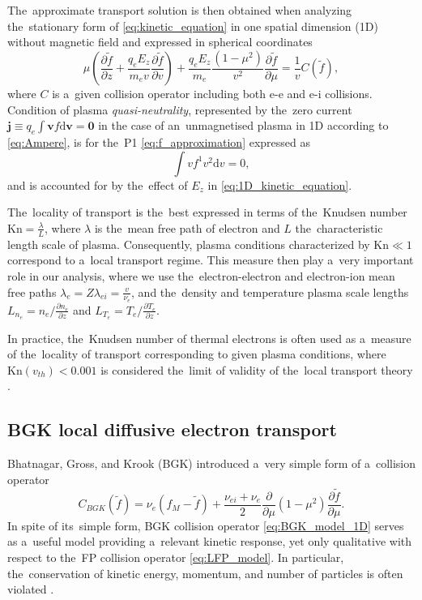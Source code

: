 \documentclass[
 aps,
 jmp,
 amsmath,amssymb,
 twocolumn,
]{revtex4-1}
\newcommand{\pdv}[2]{\frac{\partial{#1}}{\partial{#2}}}
\newcommand{\vect}[1]{\boldsymbol{#1}}
\newcommand{\dI}{\text{d}}
\newcommand{\mfpe}{\lambda_e}
\newcommand{\mfpei}{\lambda_{ei}}
\newcommand{\Zbar}{Z}
\newcommand{\nue}{\nu_{e}}
\newcommand{\nuei}{\nu_{ei}}
\newcommand{\vmag}{v}
\newcommand{\vth}{v_{th}}
\newcommand{\Ez}{E_z}
\newcommand{\qe}{q_e}
\newcommand{\me}{m_e}
\newcommand{\fM}{f_M}
\newcommand{\ft}{f}
\begin{document}
The~approximate transport solution is then obtained when analyzing 
the~stationary form of \eqref{eq:kinetic_equation} in one spatial dimension
(1D) without magnetic field and expressed in spherical coordinates 
\begin{equation}
  \mu\left(\pdv{\tilde{f}}{z} 
  + \frac{\qe\Ez}{\me\vmag}\pdv{\tilde{f}}{\vmag}\right) 
  + \frac{\qe\Ez}{\me}\frac{(1-\mu^2)}{\vmag^2}\pdv{\tilde{f}}{\mu}
  = \frac{1}{\vmag}C(\tilde{\ft}) ,
  \label{eq:1D_kinetic_equation}
\end{equation}
where $C$ is a~given collision operator including both e-e and e-i collisions.
Condition of plasma \textit{quasi-neutrality}, 
represented by the~zero current 
$\vect{j} \equiv \qe \int \vect{v} \ft \dI\vect{v} = \vect{0}$ 
in the case of an~unmagnetised plasma in 1D according to \eqref{eq:Ampere}, 
is for the~P1 \eqref{eq:f_approximation} expressed as
\begin{equation}
  \int \vmag f^1 \vmag^2 \dI\vmag = 0 ,
  \label{eq:j0_P1}
\end{equation}
and is accounted for by the~effect of $\Ez$ in \eqref{eq:1D_kinetic_equation}.

The~locality of transport is the~best expressed in terms of the~Knudsen number
$\text{Kn}=\frac{\lambda}{L}$, where $\lambda$ is the~mean free path of electron and
$L$ the~characteristic length scale of plasma. Consequently, plasma conditions
characterized by $\text{Kn}\ll1$ correspond to a~local transport regime. 
This measure then
play a~very important role in our analysis, where we use the~electron-electron
and electron-ion mean free paths $\mfpe = \Zbar\mfpei = \frac{\vmag}{\nue}$,
and the~density and temperature plasma scale lengths 
$L_{n_e} = n_e/\pdv{n_e}{z}$ and $L_{T_e} = T_e/\pdv{T_e}{z}$.

In practice, the~Knudsen number of thermal electrons is often used as 
a~measure of the~locality of transport corresponding to given plasma conditions,
where $\text{Kn}(\vth)<0.001$ is considered the~limit of validity of 
the~local transport theory \cite{LMV_1983_7}.


\subsection{BGK local diffusive electron transport}
\label{sec:BGKDiffusiveRegime}

Bhatnagar, Gross, and Krook (BGK) introduced a~very simple form
of a~collision operator \cite{BGK_1954}
\begin{equation}
  C_{BGK}(\tilde{\ft})
  =
  \nue(\fM - \tilde{\ft})
  + \frac{\nuei + \nue}{2}
  \pdv{}{\mu}(1 - \mu^2)\pdv{\tilde{\ft}}{\mu} .
  \label{eq:BGK_model_1D}
\end{equation}
In spite of its~simple form, BGK collision operator \eqref{eq:BGK_model_1D} 
serves as a~useful model providing a~relevant kinetic response, yet only 
qualitative with respect to the~FP collision operator \eqref{eq:LFP_model}.
In particular, the~conservation of kinetic energy, momentum, 
and number of particles is often violated 
\cite{Shkarofsky_Particle_Kinetics_book_1966_24}.
\end{document}
